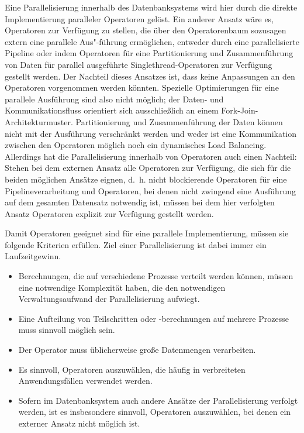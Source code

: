 \documentclass[a4paper,12pt,twoside]{article}
\begin{document}
Eine Parallelisierung innerhalb des Datenbanksystems wird hier durch die direkte Implementierung paralleler Operatoren gelöst. Ein anderer Ansatz wäre es, Operatoren zur Verfügung zu stellen, die über den Operatorenbaum sozusagen extern eine parallele Aus"-führung ermöglichen, entweder durch eine parallelisierte Pipeline oder indem Operatoren für eine Partitionierung und Zusammenführung von Daten für parallel ausgeführte Singlethread-Operatoren zur Verfügung gestellt werden. Der Nachteil dieses Ansatzes ist, dass keine Anpassungen an den Operatoren vorgenommen werden könnten. Spezielle Optimierungen für eine parallele Ausführung sind also nicht möglich; der Daten- und Kommunikationsfluss orientiert sich ausschließlich an einem Fork-Join-Architekturmuster. Partitionierung und Zusammenführung der Daten können nicht mit der Ausführung verschränkt werden und weder ist eine Kommunikation zwischen den Operatoren möglich noch ein dynamisches Load Balancing. Allerdings hat die Parallelisierung innerhalb von Operatoren auch einen Nachteil: Stehen bei dem externen Ansatz alle Operatoren zur Verfügung, die sich für die beiden möglichen Ansätze eignen, d.~h. nicht blockierende Operatoren für eine Pipelineverarbeitung und Operatoren, bei denen nicht zwingend eine Ausführung auf dem gesamten Datensatz notwendig ist, müssen bei dem hier verfolgten Ansatz Operatoren explizit zur Verfügung gestellt werden.  

Damit Operatoren geeignet sind für eine parallele Implementierung, müssen sie folgende Kriterien erfüllen. Ziel einer Parallelisierung ist dabei immer ein Laufzeitgewinn.

\begin{itemize}
	\item Berechnungen, die auf verschiedene Prozesse verteilt werden können, müssen eine notwendige Komplexität haben, die den notwendigen Verwaltungsaufwand der Parallelisierung aufwiegt.
	\item Eine Aufteilung von Teilschritten oder -berechnungen auf mehrere Prozesse muss sinnvoll möglich sein.
	\item Der Operator muss üblicherweise große Datenmengen verarbeiten.
	\item Es sinnvoll, Operatoren auszuwählen, die häufig in verbreiteten Anwendungsfällen verwendet werden.
	\item Sofern im Datenbanksystem auch andere Ansätze der Parallelisierung verfolgt werden, ist es insbesondere sinnvoll, Operatoren auszuwählen, bei denen ein externer Ansatz nicht möglich ist.
\end{itemize}
\end{document}
